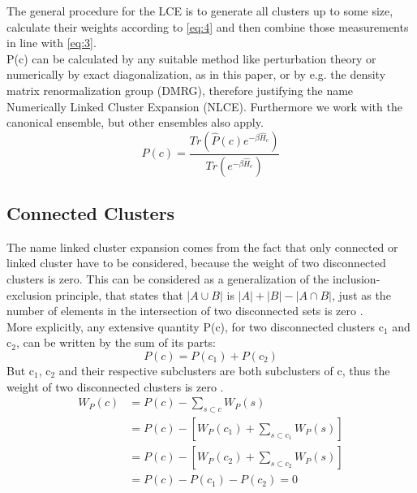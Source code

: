 \documentclass{article}
\begin{document}
The general procedure for the LCE is to generate all clusters up to
some size, calculate their weights according to \eqref{eq:4} and then combine those
measurements in line with \eqref{eq:3}.\\
P(c) can be calculated by any suitable method like perturbation theory
or numerically by exact diagonalization, as in this paper, or by e.g. the
density matrix renormalization group (DMRG), therefore justifying the name Numerically Linked Cluster
Expansion (NLCE). Furthermore we work with the canonical ensemble, but
other ensembles also apply.
\begin{equation}
\label{eq:6}
P(c) = \frac{Tr \left(\hat P(c) e^{-\beta \hat H_c} \right)}{Tr
  \left(e^{-\beta \hat H_c} \right)}
\end{equation}
\subsection{Connected Clusters}
The name linked cluster expansion comes from the fact that only
connected or linked cluster have to be considered, because the weight of two disconnected clusters is zero. This can be considered as a generalization of the
inclusion-exclusion principle, that states that $|A \cup B|$ is $|A|
+ |B| - |A \cap B|$, just as the number of elements in
the intersection of two disconnected sets is zero \cite{Melko}.\\
More explicitly, any extensive quantity P(c), for two disconnected
clusters c$_1$ and c$_2$, can be written by the sum of its parts:
\begin{equation}
\label{eq:7}
P(c) = P(c_1) + P(c_2)
\end{equation}
But c$_1$, c$_2$ and their respective subclusters are both
subclusters of c, thus the weight of two disconnected clusters is zero
\cite{Rigol}.
\begin{align}
\label{eq:8}
W_P(c) &= P(c) - \sum\limits_{s \subset c} W_P(s)\\
&= P(c) - \left[ W_P(c_1) + \sum\limits_{s \subset c_1} W_P(s)
  \right]\\
&= P(c) - \left[ W_P(c_2) + \sum\limits_{s \subset c_2} W_P(s)
  \right]\\
&= P(c) - P(c_1) -P(c_2) = 0
\end{align}
\end{document}

